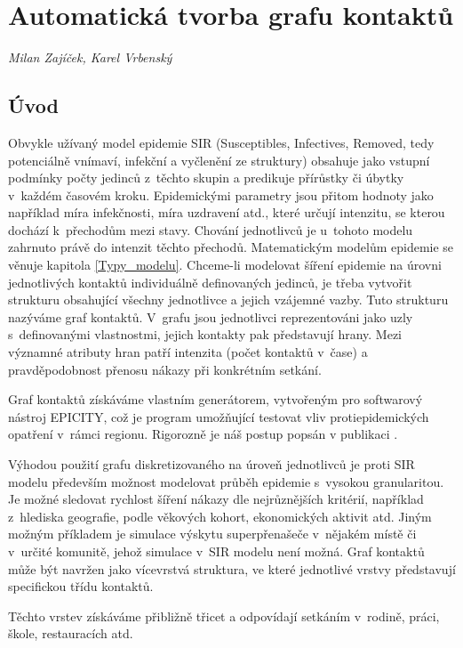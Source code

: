 
\chapter{Automatická tvorba grafu kontaktů}\label{Grafy_kontaktu}

\textit{Milan Zajíček, Karel Vrbenský}
\vspace{15mm}

\section*{Úvod}

Obvykle užívaný model epidemie SIR (Susceptibles, Infectives, Removed, tedy potenciálně vnímaví, infekční a vyčlenění ze struktury) obsahuje jako vstupní podmínky počty jedinců z~těchto skupin a predikuje přírůstky či úbytky v~každém časovém kroku. Epidemickými parametry jsou přitom hodnoty jako například míra infekčnosti, míra uzdravení atd., které určují intenzitu, se kterou dochází k~přechodům mezi stavy. Chování jednotlivců je u~tohoto modelu zahrnuto právě do intenzit těchto přechodů. Matematickým modelům epidemie se věnuje kapitola \ref{Typy_modelu}. Chceme-li modelovat šíření epidemie na úrovni jednotlivých kontaktů individuálně definovaných jedinců, je třeba vytvořit strukturu obsahující všechny jednotlivce a jejich vzájemné vazby. Tuto strukturu nazýváme graf kontaktů. V~grafu jsou jednotlivci reprezentováni jako uzly s~definovanými vlastnostmi, jejich kontakty pak představují hrany. Mezi významné atributy hran patří intenzita (počet kontaktů v~čase) a pravděpodobnost přenosu nákazy při konkrétním setkání. 

Graf kontaktů získáváme vlastním generátorem, vytvořeným pro softwarový nástroj EPICITY, což je program umožňující testovat vliv protiepidemických opatření v~rámci regionu. Rigorozně je náš postup popsán v publikaci \cite{M-techrep2021}.

Výhodou použití grafu diskretizovaného na úroveň jednotlivců je proti SIR modelu především možnost modelovat průběh epidemie s~vysokou granularitou. Je možné sledovat rychlost šíření nákazy dle nejrůznějších kritérií, například z~hlediska geografie, podle věkových kohort, ekonomických aktivit atd.  Jiným možným příkladem je simulace výskytu superpřenašeče v~nějakém místě či v~určité komunitě, jehož simulace v~SIR modelu není možná.
Graf kontaktů může být navržen jako vícevrstvá struktura, ve které jednotlivé vrstvy představují specifickou třídu kontaktů. 


Těchto vrstev získáváme přibližně třicet a odpovídají setkáním v~rodině, práci, škole, restauracích atd.

